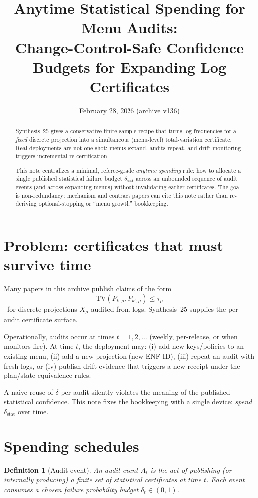 \documentclass[11pt]{article}
\title{Anytime Statistical Spending for Menu Audits:\\
\large Change-Control-Safe Confidence Budgets for Expanding Log Certificates}
\author{}
\date{February 28, 2026 (archive v136)}
\newtheorem{definition}{Definition}
\newcommand{\TV}{\mathrm{TV}}
\begin{document}
\maketitle

\begin{abstract}
Synthesis~25 gives a conservative finite-sample recipe that turns log frequencies for a \emph{fixed} discrete projection into a simultaneous (menu-level) total-variation certificate.
Real deployments are not one-shot:
menus expand, audits repeat, and drift monitoring triggers incremental re-certification.

This note centralizes a minimal, referee-grade \emph{anytime spending} rule: how to allocate a single published statistical failure budget $\delta_{\mathrm{stat}}$ across an unbounded sequence of audit events (and across expanding menus) without invalidating earlier certificates.
The goal is non-redundancy: mechanism and contract papers can cite this note rather than re-deriving optional-stopping or ``menu growth'' bookkeeping.
\end{abstract}

\section{Problem: certificates that must survive time}
Many papers in this archive publish claims of the form
\[\TV(P_{k,\mu},P_{k',\mu})\le \tau_{\mu}\]\
for discrete projections $X_\mu$ audited from logs.
Synthesis~25 supplies the per-audit certificate surface.\cite{series:stataudit}

Operationally, audits occur at times $t=1,2,\dots$ (weekly, per-release, or when monitors fire).
At time $t$, the deployment may:
(i) add new keys/policies to an existing menu,
(ii) add a new projection (new ENF-ID),
(iii) repeat an audit with fresh logs, or
(iv) publish drift evidence that triggers a new receipt under the plan/state equivalence rules.\cite{series:planstateequiv,series:accountingrulebook}

A naive reuse of $\delta$ per audit silently violates the meaning of the published statistical confidence.
This note fixes the bookkeeping with a single device: \emph{spend} $\delta_{\mathrm{stat}}$ over time.

\section{Spending schedules}
\begin{definition}[Audit event]
An \emph{audit event} $A_t$ is the act of publishing (or internally producing) a finite set of statistical certificates at time $t$.
Each event consumes a chosen failure probability budget $\delta_t\in(0,1)$.
\end{definition}
\end{document}
